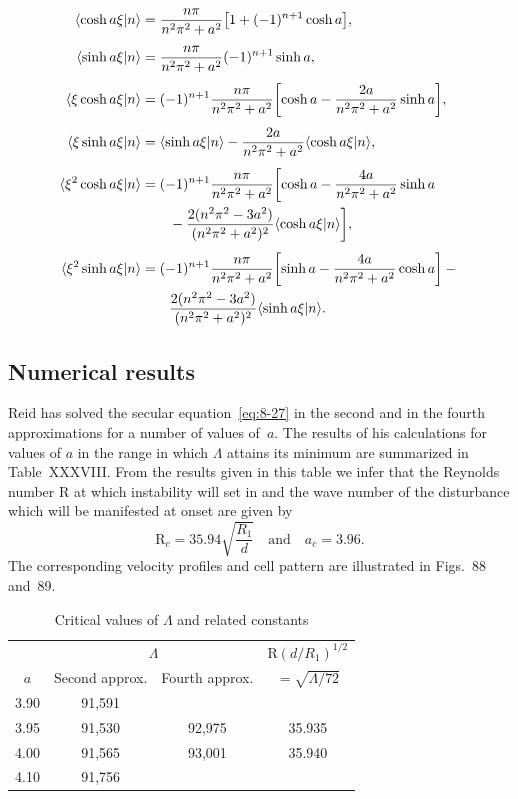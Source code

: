 \begin{align}
\label{eq:8-31}
\langle\cosh a\xi|n\rangle &= \frac{n\pi}{n^2\pi^2 + a^2}\bigl[1 + (-1)^{n+1}\cosh a\bigr], \notag\\[4pt]
\langle\sinh a\xi|n\rangle &= \frac{n\pi}{n^2\pi^2 + a^2}(-1)^{n+1}\sinh a, \notag\\[4pt]
\langle\xi\cosh a\xi|n\rangle &= (-1)^{n+1}\frac{n\pi}{n^2\pi^2 + a^2}\biggl[\cosh a - \frac{2a}{n^2\pi^2 + a^2}\sinh a\biggr], \notag\\[4pt]
\langle\xi\sinh a\xi|n\rangle &= \langle\sinh a\xi|n\rangle - \frac{2a}{n^2\pi^2 + a^2}\langle\cosh a\xi|n\rangle, \notag\\[4pt]
\langle\xi^2\cosh a\xi|n\rangle &= (-1)^{n+1}\frac{n\pi}{n^2\pi^2 + a^2}\biggl[\cosh a - \frac{4a}{n^2\pi^2 + a^2}\sinh a \notag\\
&\qquad - \frac{2(n^2\pi^2 - 3a^2)}{(n^2\pi^2 + a^2)^2}\langle\cosh a\xi|n\rangle\biggr], \notag\\[4pt]
\langle\xi^2\sinh a\xi|n\rangle &= (-1)^{n+1}\frac{n\pi}{n^2\pi^2 + a^2}\biggl[\sinh a - \frac{4a}{n^2\pi^2 + a^2}\cosh a\biggr] - {} \notag\\
&\qquad \frac{2(n^2\pi^2 - 3a^2)}{(n^2\pi^2+a^2)^2}\langle\sinh a\xi|n\rangle.
\end{align}

\subsection{Numerical results}
\label{sec:76c}

Reid has solved the secular equation~\eqref{eq:8-27} in the second and in the fourth approximations for a number of values of~$a$. The results of his calculations for values of $a$ in the range in which $\Lambda$ attains its minimum are summarized in Table~XXXVIII. From the results given in this table we infer that the Reynolds number R at which instability will set in and the wave number of the disturbance which will be manifested at onset are given by
\begin{equation}
\label{eq:8-32}
\mathrm{R}_c = 35.94\sqrt{\frac{R_1}{d}} \quad \text{and} \quad a_c = 3.96.
\end{equation}
The corresponding velocity profiles and cell pattern are illustrated in Figs.~88 and~89.

\begin{table}[ht]
\centering
\caption{Critical values of $\Lambda$ and related constants}
\label{tab:XXXVIII}
\begin{tabular}{cccc}
\hline
 & \multicolumn{2}{c}{$\Lambda$} & $\mathrm{R}(d/R_1)^{1/2}$ \\
$a$ & Second approx. & Fourth approx. & $= \sqrt{\Lambda/72}$ \\
\hline
3.90 & 91,591 & & \\
3.95 & 91,530 & 92,975 & 35.935 \\
4.00 & 91,565 & 93,001 & 35.940 \\
4.10 & 91,756 & & \\
\hline
\end{tabular}
\end{table}

